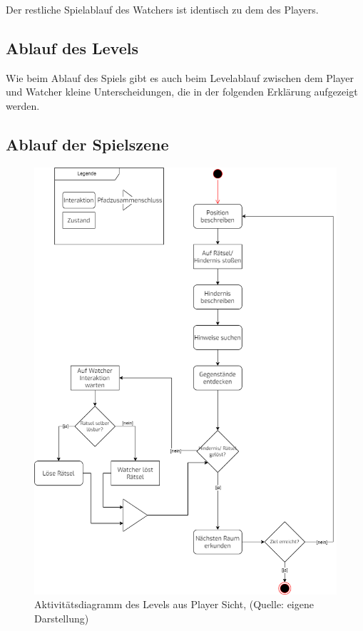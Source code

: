 Der restliche Spielablauf des Watchers ist identisch zu dem des Players.

\subsection{Ablauf des Levels}
Wie beim Ablauf des Spiels gibt es auch beim Levelablauf zwischen dem Player und Watcher kleine Unterscheidungen, die in der folgenden Erklärung aufgezeigt werden.

\subsection{Ablauf der Spielszene}
\begin{figure}[ht]
\centering
\includegraphics[width=1\linewidth]{content/pictures/LevelLoop-Player.drawio.png}
\caption{Aktivitätsdiagramm des Levels aus Player Sicht, (Quelle: eigene Darstellung)}
\label{fig:level-loop-player}
\end{figure}


